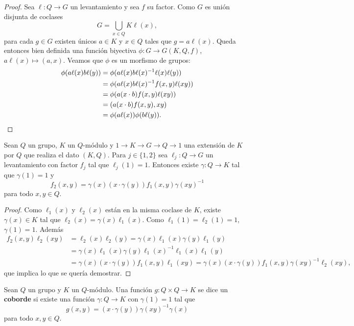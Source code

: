 \begin{proof}
	Sea $\ell\colon Q\to G$ un levantamiento y sea $f$ su factor. Como $G$ es
	unión disjunta de coclases
	\[
		G=\bigcup_{x\in Q}K\ell(x),
	\]
	para cada $g\in G$ existen únicos $a\in K$ y $x\in Q$ tales que
	$g=a\ell(x)$. Queda entonces bien definida una función biyectiva
	$\phi\colon G\to G(K,Q,f)$, $a\ell(x)\mapsto (a,x)$. Veamos que $\phi$ es
	un morfismo de grupos: 
	\begin{align*}
		\phi(a\ell(x)b\ell(y)) 
		&=\phi(a\ell(x)b\ell(x)^{-1}\ell(x)\ell(y))\\
		&=\phi(a\ell(x)b\ell(x)^{-1}f(x,y)\ell(xy))\\
		&=\phi(a(x\cdot b)f(x,y)\ell(xy))\\
		&=(a(x\cdot b)f(x,y),xy)\\
		&=\phi(a\ell(x))\phi(b\ell(y)).\qedhere
	\end{align*}
\end{proof}

\begin{lemma}
	\label{lemma:coborde}
	Sean $Q$ un grupo, $K$ un $Q$-módulo y $1\to K\to G\to Q\to 1$ una
	extensión de $K$ por $Q$ que realiza el dato $(K,Q)$. Para $j\in\{1,2\}$
	sea $\ell_j\colon Q\to G$ un levantamiento con factor $f_j$ tal que
	$\ell_j(1)=1$.  Entonces existe $\gamma\colon Q\to K$ tal que $\gamma(1)=1$
	y 
	\[
		f_2(x,y)=\gamma(x)(x\cdot \gamma(y))f_1(x,y)\gamma(xy)^{-1}
	\]
	para todo $x,y\in Q$.
\end{lemma}

\begin{proof}
	Como $\ell_1(x)$ y $\ell_2(x)$ están en la misma coclase de
	$K$, existe $\gamma(x)\in K$ tal que $\ell_2(x)=\gamma(x)\ell_1(x)$. Como
	$\ell_1(1)=\ell_2(1)=1$, $\gamma(1)=1$. Además 
	\begin{align*}
		f_2(x,y)\ell_2(xy)&=\ell_2(x)\ell_2(y) = \gamma(x)\ell_1(x)\gamma(y)\ell_1(y)\\
		&=\gamma(x)\ell_1(x)\gamma(y)\ell_1(x)^{-1}\ell_1(x)\ell_1(y)\\
		&=\gamma(x)(x\cdot \gamma(y))f_1(x,y)\ell_1(xy)
		=\gamma(x)(x\cdot \gamma(y))f_1(x,y)\gamma(xy)^{-1}\ell_2(xy),
	\end{align*}
	que implica lo que se quería demostrar.
\end{proof}

\begin{definition}
	Sean $Q$ un grupo y $K$ un $Q$-módulo. Una función $g\colon Q\times Q\to K$
	se dice un \textbf{coborde} si existe una función $\gamma\colon Q\to K$ con
	$\gamma(1)=1$ tal que
	\[
	g(x,y)=(x\cdot \gamma(y))\gamma(xy)^{-1}\gamma(x)
	\]
	para todo $x,y\in Q$.
\end{definition}

